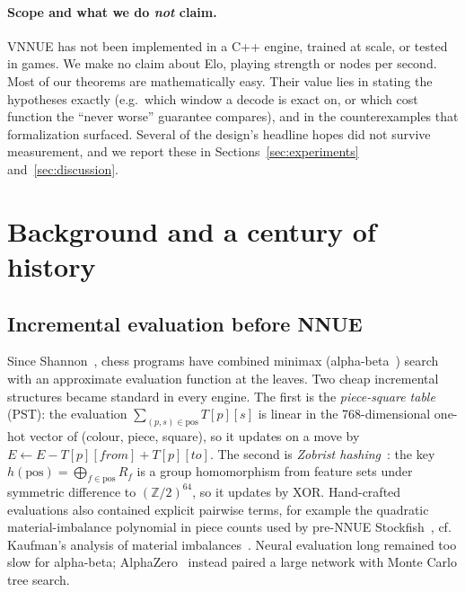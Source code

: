 \documentclass[10pt]{article}
\newcommand{\Z}{\mathbb{Z}}
\theoremstyle{plain}
\theoremstyle{definition}
\begin{document}
\paragraph{Scope and what we do \emph{not} claim.}
VNNUE has not been implemented in a C++ engine, trained at scale, or tested in games.
We make no claim about Elo, playing strength or nodes per second.
Most of our theorems are mathematically easy.
Their value lies in stating the hypotheses exactly (e.g.\ which window a decode is exact on, or which cost function the ``never worse'' guarantee compares), and in the counterexamples that formalization surfaced.
Several of the design's headline hopes did not survive measurement, and we report these in Sections~\ref{sec:experiments} and~\ref{sec:discussion}.

\section{Background and a century of history}\label{sec:background}

\subsection{Incremental evaluation before NNUE}

Since Shannon~\cite{shannon1950}, chess programs have combined minimax (alpha-beta~\cite{knuth1975}) search with an approximate evaluation function at the leaves.
Two cheap incremental structures became standard in every engine.
The first is the \emph{piece-square table} (PST): the evaluation $\sum_{(p,s)\in\text{pos}}T[p][s]$ is linear in the 768-dimensional one-hot vector of (colour, piece, square), so it updates on a move by $E\gets E-T[p][\mathit{from}]+T[p][\mathit{to}]$.
The second is \emph{Zobrist hashing}~\cite{zobrist1970}: the key $h(\text{pos})=\bigoplus_{f\in\text{pos}}R_f$ is a group homomorphism from feature sets under symmetric difference to $(\Z/2)^{64}$, so it updates by XOR.
Hand-crafted evaluations also contained explicit pairwise terms, for example the quadratic material-imbalance polynomial in piece counts used by pre-NNUE Stockfish~\cite{sf11}, cf. Kaufman's analysis of material imbalances~\cite{kaufman1999}.
Neural evaluation long remained too slow for alpha-beta; AlphaZero~\cite{silver2018} instead paired a large network with Monte Carlo tree search.
\end{document}
